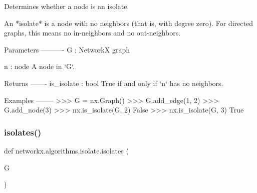 \begin{DoxyVerb}Determines whether a node is an isolate.

An *isolate* is a node with no neighbors (that is, with degree
zero). For directed graphs, this means no in-neighbors and no
out-neighbors.

Parameters
----------
G : NetworkX graph

n : node
    A node in `G`.

Returns
-------
is_isolate : bool
   True if and only if `n` has no neighbors.

Examples
--------
>>> G = nx.Graph()
>>> G.add_edge(1, 2)
>>> G.add_node(3)
>>> nx.is_isolate(G, 2)
False
>>> nx.is_isolate(G, 3)
True
\end{DoxyVerb}
 \mbox{\label{namespacenetworkx_1_1algorithms_1_1isolate_a74078653ae94897579962c208cf40e79}} 
\subsubsection{\texorpdfstring{isolates()}{isolates()}}
{\footnotesize\ttfamily def networkx.\+algorithms.\+isolate.\+isolates (\begin{DoxyParamCaption}\item[{}]{G }\end{DoxyParamCaption})}

